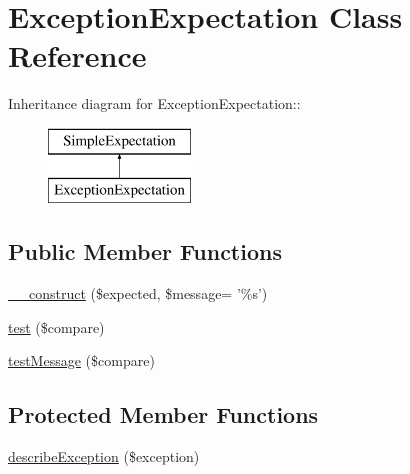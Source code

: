 \hypertarget{class_exception_expectation}{
\section{ExceptionExpectation Class Reference}
\label{class_exception_expectation}
}
Inheritance diagram for ExceptionExpectation::\begin{figure}[H]
\begin{center}
\leavevmode
\includegraphics[height=2cm]{class_exception_expectation}
\end{center}
\end{figure}
\subsection*{Public Member Functions}
\begin{DoxyCompactItemize}
\item 
\hyperlink{class_exception_expectation_a98ec83b769c415a3d29c800665a07c8f}{\_\-\_\-construct} (\$expected, \$message= '\%s')
\item 
\hyperlink{class_exception_expectation_a302c92bdfd0dc2bb308e8f85628dbc2b}{test} (\$compare)
\item 
\hyperlink{class_exception_expectation_afe072b85351847a113ee868c6548fbc5}{testMessage} (\$compare)
\end{DoxyCompactItemize}
\subsection*{Protected Member Functions}
\begin{DoxyCompactItemize}
\item 
\hyperlink{class_exception_expectation_a4f7a76d97a172afd6d3c60ce42ab01f6}{describeException} (\$exception)
\end{DoxyCompactItemize}


